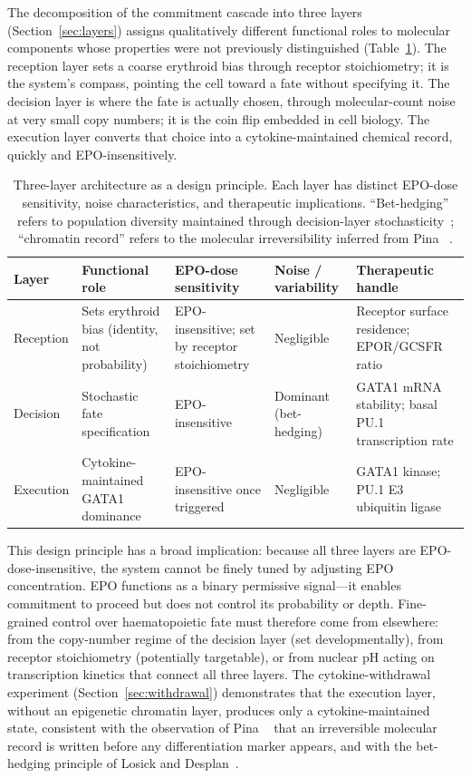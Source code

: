 The decomposition of the commitment cascade into three layers
(Section~\ref{sec:layers}) assigns qualitatively different functional roles to
molecular components whose properties were not previously distinguished
(Table~\ref{tab:layers_disc}). The reception layer sets a coarse erythroid bias
through receptor stoichiometry; it is the system's compass, pointing the cell
toward a fate without specifying it. The decision layer is where the fate is
actually chosen, through molecular-count noise at very small copy numbers; it is
the coin flip embedded in cell biology. The execution layer converts that choice
into a cytokine-maintained chemical record, quickly and EPO-insensitively.

\begin{table}[ht]
\caption{Three-layer architecture as a design principle. Each layer has distinct
EPO-dose sensitivity, noise characteristics, and therapeutic implications.
``Bet-hedging'' refers to population diversity maintained through decision-layer
stochasticity~\cite{losick2008}; ``chromatin record'' refers to the molecular
irreversibility inferred from Pina \etal~\cite{pina2012}.}
\label{tab:layers_disc}
\centering
\small
\begin{tabularx}{\linewidth}{@{}lXXXX@{}}
\toprule
\textbf{Layer} & \textbf{Functional role} & \textbf{EPO-dose sensitivity} &
\textbf{Noise / variability} & \textbf{Therapeutic handle} \\
\midrule
Reception & Sets erythroid bias (identity, not probability) &
EPO-insensitive; set by receptor stoichiometry & Negligible &
Receptor surface residence; EPOR/GCSFR ratio \\
\addlinespace
Decision & Stochastic fate specification & EPO-insensitive &
Dominant (bet-hedging) & GATA1 mRNA stability; basal PU.1 transcription rate \\
\addlinespace
Execution & Cytokine-maintained GATA1 dominance & EPO-insensitive once
triggered & Negligible & GATA1 kinase; PU.1 E3 ubiquitin ligase \\
\bottomrule
\end{tabularx}
\end{table}

This design principle has a broad implication: because all three layers are
EPO-dose-insensitive, the system cannot be finely tuned by adjusting EPO
concentration. EPO functions as a binary permissive signal---it enables
commitment to proceed but does not control its probability or depth. Fine-grained
control over haematopoietic fate must therefore come from elsewhere: from the
copy-number regime of the decision layer (set developmentally), from receptor
stoichiometry (potentially targetable), or from nuclear pH acting on
transcription kinetics that connect all three layers. The cytokine-withdrawal
experiment (Section~\ref{sec:withdrawal}) demonstrates that the execution layer,
without an epigenetic chromatin layer, produces only a cytokine-maintained state,
consistent with the observation of Pina \etal~\cite{pina2012} that an irreversible
molecular record is written before any differentiation marker appears, and with
the bet-hedging principle of Losick and Desplan~\cite{losick2008}.

